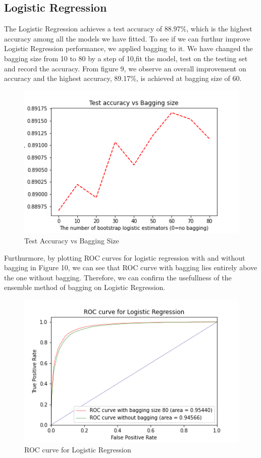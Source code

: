 \documentclass[10pt,twocolumn,letterpage]{article}
\begin{document}
		\subsection{Logistic Regression}
		The Logistic Regression achieves a test accuracy of 88.97\%, which is the highest accuracy among all the models we have fitted. To see if we can furthur improve Logistic Regression performance, we applied bagging to it. We have changed the bagging size from 10 to 80 by a step of 10,fit the model, test on the testing set and record the accuracy. From figure 9, we observe an overall improvement on accuracy and the highest accuracy, 89.17\%, is achieved at bagging size of 60.
		\begin{figure}[htbp]
			\includegraphics[width=\columnwidth]{Logistic_bagging}
			\caption{Test Accuracy vs Bagging Size}\label{Logistic_bagging}
		\end{figure} 	
		 Furthurmore, by plotting ROC curves for logistic regression with and without bagging in Figure 10, we can see that ROC curve with bagging lies entirely above the one without bagging. Therefore, we can confirm the usefullness of the ensemble method of bagging on Logistic Regression.
		
		\begin{figure}[htbp]
			\includegraphics[width=\columnwidth]{ROCComparsion}
			\caption{ROC curve for Logistic Regression}\label{ROCComparsion}
		\end{figure} 	
\end{document}

